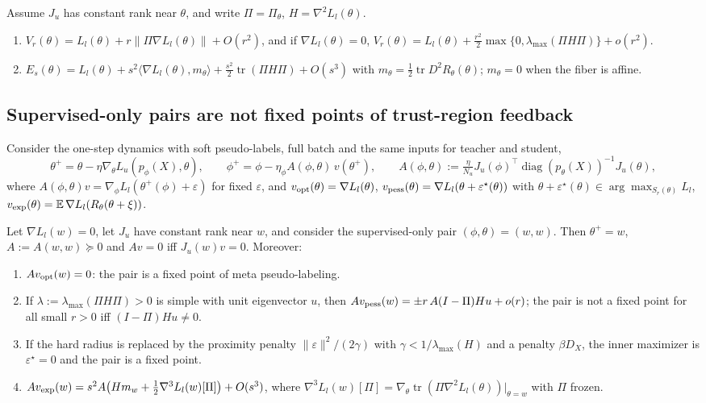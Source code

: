 \begin{proposition}[Expansions]\label{prop:expansions}
Assume $J_u$ has constant rank near $\theta$, and write $\Pi=\Pi_\theta$, $H=\nabla^2L_l(\theta)$.
\begin{enumerate}
\item[(i)] $V_r(\theta)=L_l(\theta)+r\|\Pi\nabla L_l(\theta)\|+O(r^2)$, and if
$\nabla L_l(\theta)=0$, $V_r(\theta)=L_l(\theta)+\frac{r^2}{2}\max\{0,\lambda_{\max}(\Pi H\Pi)\}+o(r^2)$.
\item[(ii)] $E_s(\theta)=L_l(\theta)+s^2\langle\nabla L_l(\theta),m_\theta\rangle
+\frac{s^2}{2}\operatorname{tr}(\Pi H\Pi)+O(s^3)$ with $m_\theta=\frac12\operatorname{tr}D^2R_\theta(\theta)$;
$m_\theta=0$ when the fiber is affine.
\end{enumerate}
\end{proposition}

\subsection{Supervised-only pairs are not fixed points of trust-region feedback}

Consider the one-step dynamics with soft pseudo-labels, full batch and the same inputs for
teacher and student,
\[
\theta^+=\theta-\eta\nabla_\theta L_u(p_\phi(X),\theta),\qquad
\phi^+=\phi-\eta_\phi A(\phi,\theta)\,v(\theta^+),\qquad
A(\phi,\theta):=\tfrac{\eta}{N_u}J_u(\phi)^\top\operatorname{diag}(p_\theta(X))^{-1}J_u(\theta),
\]
where $A(\phi,\theta)v=\nabla_\phi L_l(\theta^+(\phi)+\varepsilon)$ for fixed $\varepsilon$, and
$v_{\rm opt}(\theta)=\nabla L_l(\theta)$,
$v_{\rm pess}(\theta)=\nabla L_l(\theta+\varepsilon^\star(\theta))$ with
$\theta+\varepsilon^\star(\theta)\in\arg\max_{S_r(\theta)}L_l$,
$v_{\rm exp}(\theta)=\mathbb E\,\nabla L_l(R_\theta(\theta+\xi))$.

\begin{proposition}\label{prop:fixedpoints}
Let $\nabla L_l(w)=0$, let $J_u$ have constant rank near $w$, and consider the
supervised-only pair $(\phi,\theta)=(w,w)$. Then $\theta^+=w$, $A:=A(w,w)\succeq0$ and
$Av=0$ iff $J_u(w)v=0$. Moreover:
\begin{enumerate}
\item[(a)] $Av_{\rm opt}(w)=0$: the pair is a fixed point of meta pseudo-labeling.
\item[(b)] If $\lambda:=\lambda_{\max}(\Pi H\Pi)>0$ is simple with unit eigenvector $u$, then
$Av_{\rm pess}(w)=\pm r\,A(I-\Pi)Hu+o(r)$; the pair is not a fixed point for all small
$r>0$ iff $(I-\Pi)Hu\neq0$.
\item[(c)] If the hard radius is replaced by the proximity penalty $\|\varepsilon\|^2/(2\gamma)$
with $\gamma<1/\lambda_{\max}(H)$ and a penalty $\beta D_X$, the inner maximizer is
$\varepsilon^\star=0$ and the pair is a fixed point.
\item[(d)] $Av_{\rm exp}(w)=s^2A\big(Hm_w+\tfrac12\nabla^3L_l(w)[\Pi]\big)+O(s^3)$, where
$\nabla^3L_l(w)[\Pi]=\nabla_\theta\operatorname{tr}(\Pi\nabla^2L_l(\theta))|_{\theta=w}$ with $\Pi$
frozen.
\end{enumerate}
\end{proposition}

